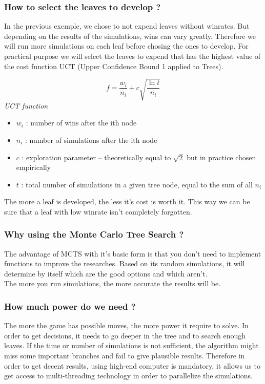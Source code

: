 \subsubsection{How to select the leaves to develop ?}
In the previous exemple, we chose to not expend leaves without winrates. But depending on the results of the simulations, wins can vary greatly. Therefore we will run more simulations on each leaf before chosing the ones to develop. For practical purpose we will select the leaves to expend that has the highest value of the cost function UCT (Upper Confidence Bound 1 applied to Trees).\\
\bigskip
\begin{minipage}[b]{1\linewidth}
\centering
\begin{equation*}
f = \frac{w_i}{n_i} + c\sqrt{\frac{\ln t}{n_i}}
\end{equation*}
\medskip
\textit{UCT function}\cite{formula_UCT}

\end{minipage}%
\bigskip
\begin{itemize}
  \item \ensuremath{w_i} : number of wins after the ith node
  \item \ensuremath{n_i} : number of simulations after the ith node
  \item \ensuremath{c}   : exploration parameter – theoretically equal to \ensuremath{\sqrt{2}} but in practice chosen empirically
  \item \ensuremath{t}   : total number of simulations in a given tree node, equal to the sum of all \ensuremath{n_i}
\end{itemize}
\medskip
The more a leaf is developed, the less it's cost is worth it. This way we can be sure that a leaf with low winrate isn't completely forgotten.\\

\subsubsection{Why using the Monte Carlo Tree Search ?}
 The advantage of MCTS with it's basic form is that you don't need to implement functions to improve the researches. Based on its random simulations, it will determine by itself which are the good options and which aren't.\\ The more you run simulations, the more accurate the results will be.

\subsubsection{How much power do we need ?}
The more the game has possible moves, the more power it require to solve. In order to get decisions, it needs to go deeper in the tree and to search enough leaves. If the time or number of simulations is not sufficient, the algorithm might miss some important branches and fail to give plausible results. Therefore in order to get decent results, using high-end computer is mandatory, it allows us to get access to multi-threading technology in order to parallelize the simulations.